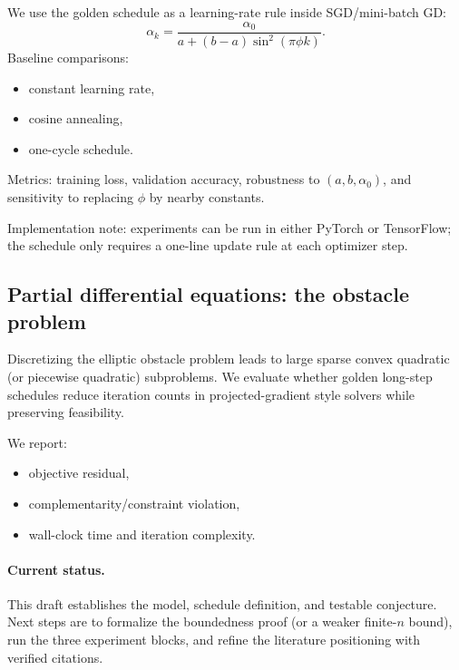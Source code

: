 \documentclass{article}
\begin{document}
We use the golden schedule as a learning-rate rule inside SGD/mini-batch GD:
\[
\alpha_k=\frac{\alpha_0}{a+(b-a)\sin^2(\pi\phi k)}.
\]
Baseline comparisons:
\begin{itemize}
\item constant learning rate,
\item cosine annealing,
\item one-cycle schedule.
\end{itemize}

Metrics: training loss, validation accuracy, robustness to $(a,b,\alpha_0)$, and
sensitivity to replacing $\phi$ by nearby constants.

Implementation note: experiments can be run in either PyTorch or TensorFlow; the
schedule only requires a one-line update rule at each optimizer step.

\subsection{Partial differential equations: the obstacle problem}

Discretizing the elliptic obstacle problem leads to large sparse convex quadratic (or
piecewise quadratic) subproblems. We evaluate whether golden long-step schedules reduce
iteration counts in projected-gradient style solvers while preserving feasibility.

We report:
\begin{itemize}
\item objective residual,
\item complementarity/constraint violation,
\item wall-clock time and iteration complexity.
\end{itemize}

\paragraph{Current status.}
This draft establishes the model, schedule definition, and testable conjecture.
Next steps are to formalize the boundedness proof (or a weaker finite-$n$ bound),
run the three experiment blocks, and refine the literature positioning with verified
citations.
\end{document}
